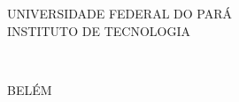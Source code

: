 \thispagestyle{empty} %

\begin{center}
    
\end{center}

\begin{center}    
    UNIVERSIDADE FEDERAL DO PARÁ \\
    INSTITUTO DE TECNOLOGIA \\
    \vspace{4 cm}
    
    
    \vspace{4 cm}
    
    \Large
    \textbf{\eixo}\\
    \assunto

    \normalsize
    \vspace*{\fill} %
    
    BELÉM \\ 
    \ano
\end{center}